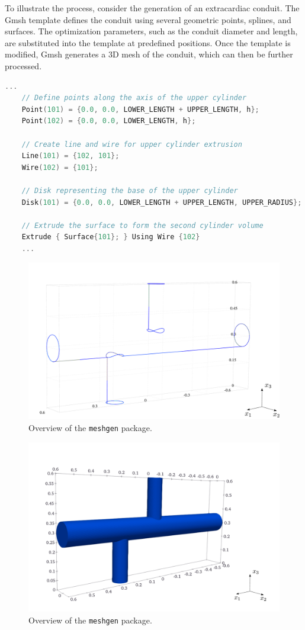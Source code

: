 To illustrate the process, consider the generation of an extracardiac conduit. The Gmsh template defines the conduit using several geometric points, splines, and surfaces. The optimization parameters, such as the conduit diameter and length, are substituted into the template at predefined positions. Once the template is modified, Gmsh generates a 3D mesh of the conduit, which can then be further processed.

\begin{lstlisting}[language=C++]
	...
	// Define points along the axis of the upper cylinder
	Point(101) = {0.0, 0.0, LOWER_LENGTH + UPPER_LENGTH, h};
	Point(102) = {0.0, 0.0, LOWER_LENGTH, h};
	
	// Create line and wire for upper cylinder extrusion
	Line(101) = {102, 101};
	Wire(102) = {101};
	
	// Disk representing the base of the upper cylinder
	Disk(101) = {0.0, 0.0, LOWER_LENGTH + UPPER_LENGTH, UPPER_RADIUS};
	
	// Extrude the surface to form the second cylinder volume
	Extrude { Surface{101}; } Using Wire {102}
	...
\end{lstlisting}


\begin{figure}[H]
	\centering
	\vspace{6mm}
	\includegraphics[width=.99\textwidth]{figures/gmsh.pdf}
	\vspace{4mm}
	\caption{Overview of the \texttt{meshgen} package.}
	\label{fig:gmsh}
\end{figure}



\begin{figure}[H]
	\centering
	\vspace{6mm}
	\includegraphics[width=.99\textwidth]{figures/stl.pdf}
	\vspace{4mm}
	\caption{Overview of the \texttt{meshgen} package.}
	\label{fig:stl}
\end{figure}
